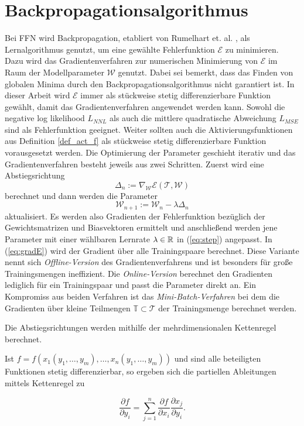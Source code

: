  \section*{Backpropagationsalgorithmus}
Bei FFN wird Backpropagation, etabliert von Rumelhart et. al. \cite{MLPbook}, als Lernalgorithmus genutzt, um eine gewählte Fehlerfunktion $\mathcal{E}$ zu minimieren. Dazu wird das Gradientenverfahren zur numerischen Minimierung von $\mathcal{E}$ im Raum der Modellparameter $\mathcal{W}$ genutzt. Dabei sei bemerkt, dass das Finden von globalen Minima durch den Backpropagationsalgorithmus nicht garantiert ist.
In dieser Arbeit wird $\mathcal{E}$ immer als stückweise stetig differenzierbare Funktion gewählt, damit das Gradientenverfahren angewendet werden kann. Sowohl die negative log likelihood $L_{NNL}$ als auch die mittlere quadratische Abweichung $L_{MSE}$ sind als Fehlerfunktion geeignet. Weiter sollten auch die Aktivierungsfunktionen aus Definition \ref{def_act_f} als stückweise stetig differenzierbare Funktion vorausgesetzt werden. 
Die Optimierung der Parameter geschieht iterativ und das Gradientenverfahren besteht jeweils aus zwei Schritten. Zuerst wird eine Abstiegsrichtung 
\begin{equation}
    \label{eq:gradE}
    \Delta_n := \nabla_{\mathcal{W}} \mathcal{E}(\mathcal{T},\mathcal{W})
\end{equation} 
berechnet und dann werden die Parameter 
\begin{equation}
    \label{eq:step}
    \mathcal{W}_{n+1}:=\mathcal{W}_n - \lambda \Delta_n
\end{equation}
aktualisiert. Es werden also Gradienten der Fehlerfunktion bezüglich der Gewichtsmatrizen und Biasvektoren ermittelt und anschließend werden jene Parameter mit einer wählbaren Lernrate $\lambda \in \mathbb{R}$ in (\ref{eq:step}) angepasst. In (\ref{eq:gradE}) wird der Gradient über alle Trainingspaare berechnet. Diese Variante nennt sich \textit{Offline-Version} des Gradientenverfahrens und ist besonders für große Trainingsmengen ineffizient. Die \textit{Online-Version} berechnet den Gradienten lediglich für ein Trainingspaar und passt die Parameter direkt an. Ein Kompromiss aus beiden Verfahren ist das \textit{Mini-Batch-Verfahren} bei dem die Gradienten über kleine Teilmengen $\mathbb{T} \subset \mathcal{T}$ der Trainingsmenge berechnet werden.

Die Abstiegsrichtungen werden mithilfe der mehrdimensionalen Kettenregel  berechnet.
\begin{satz}
    \label{s:chainrule}
    Ist $f=f(x_1(y_1, \ldots, y_m), \ldots, x_n(y_1, \ldots, y_m))$ und sind alle beteiligten Funktionen stetig differenzierbar, so ergeben sich die partiellen Ableitungen mittels Kettenregel zu

    \begin{equation*}
        \frac{\partial f}{\partial y_i}=\sum_{j=1}^n \frac{\partial f}{\partial x_i} \frac{\partial x_j}{\partial y_i} .
    \end{equation*}
\end{satz}

